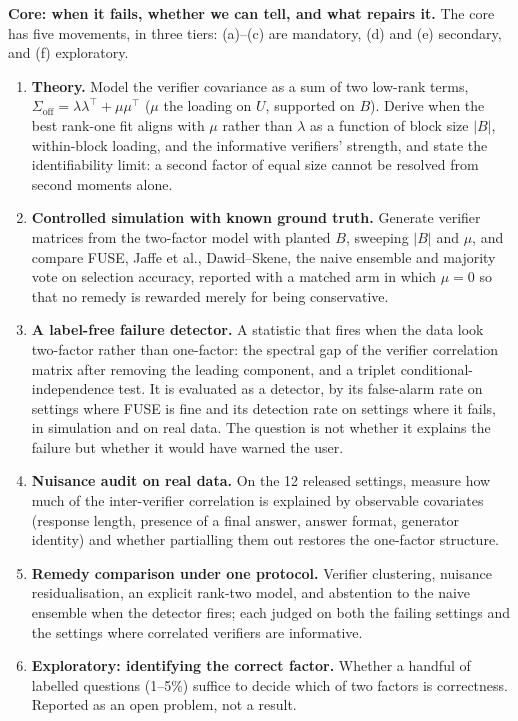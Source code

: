 \documentclass[11pt]{article}
\begin{document}
\textbf{Core: when it fails, whether we can tell, and what repairs it.} The core has
five movements, in three tiers: (a)--(c) are mandatory, (d) and (e) secondary,
and (f) exploratory.
\begin{enumerate}[label=\alph*)]
\item \textbf{Theory.} Model the verifier covariance as a sum of two low-rank terms,
$\Sigma_{\text{off}}=\lambda\lambda^\top+\mu\mu^\top$ ($\mu$ the loading on $U$, supported on
$B$). Derive when the best rank-one fit aligns with $\mu$ rather than $\lambda$ as a
function of block size $|B|$, within-block loading, and the informative verifiers'
strength, and state the identifiability limit: a second factor of equal size cannot be
resolved from second moments alone.
\item \textbf{Controlled simulation with known ground truth.} Generate verifier matrices
from the two-factor model with planted $B$, sweeping $|B|$ and $\mu$, and compare FUSE,
Jaffe et al., Dawid--Skene, the naive ensemble and majority vote on selection accuracy,
reported with a matched arm in which $\mu=0$ so that no remedy is rewarded merely for
being conservative.
\item \textbf{A label-free failure detector.} A statistic that fires when the data look
two-factor rather than one-factor: the spectral gap of the verifier correlation matrix
after removing the leading component, and a triplet conditional-independence test. It is
evaluated as a detector, by its false-alarm rate on settings where FUSE is fine and its
detection rate on settings where it fails, in simulation and on real data. The question
is not whether it explains the failure but whether it would have warned the user.
\item \textbf{Nuisance audit on real data.} On the 12 released settings, measure how much
of the inter-verifier correlation is explained by observable covariates (response length,
presence of a final answer, answer format, generator identity) and whether partialling
them out restores the one-factor structure.
\item \textbf{Remedy comparison under one protocol.} Verifier clustering, nuisance
residualisation, an explicit rank-two model, and abstention to the naive ensemble when
the detector fires; each judged on both the failing settings and the settings where
correlated verifiers are informative.
\item \textbf{Exploratory: identifying the correct factor.} Whether a handful of labelled
questions (1--5\%) suffice to decide which of two factors is correctness. Reported as an
open problem, not a result.
\end{enumerate}
\end{document}
